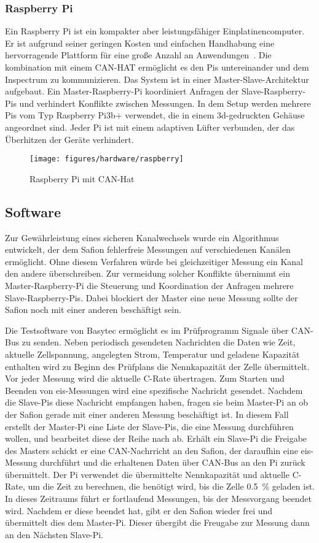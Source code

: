 \subsubsection{Raspberry Pi}
Ein Raspberry Pi ist ein kompakter aber leistungsfähiger Einplatinencomputer.
Er ist aufgrund seiner geringen Kosten und einfachen Handhabung eine hervorragende Plattform für eine
große Anzahl an Anwendungen~\cite{raspberry_rs485}.
Die kombination mit einem CAN-HAT ermöglicht es den Pis untereinander und dem Inspectrum zu kommunizieren.
Das System ist in einer Master-Slave-Architektur aufgebaut.
Ein Master-Raspberry-Pi koordiniert Anfragen der Slave-Raspberry-Pis und verhindert Konflikte zwischen Messungen.
In dem Setup werden mehrere Pis vom Typ Raspberry Pi3b+ verwendet, die in einem 3d-gedruckten Gehäuse angeordnet sind.
Jeder Pi ist mit einem adaptiven Lüfter verbunden, der das Überhitzen der Geräte verhindert.
\begin{figure} [H]
    \centering
    \texttt{[image: figures/hardware/raspberry]}
    \caption{Raspberry Pi mit CAN-Hat~\cite{raspberry_rs485}}
    \label{fig:raspberry}
\end{figure}

\subsection{Software}
\label{subsec:software-basy}
Zur Gewährleistung eines sicheren Kanalwechsels wurde ein Algorithmus entwickelt, der dem Safion fehlerfreie Messungen
auf verschiedenen Kanälen ermöglicht.
Ohne diesem Verfahren würde bei gleichzeitiger Messung ein Kanal den andere überschreiben.
Zur vermeidung solcher Konflikte übernimmt ein Master-Raspberry-Pi die Steuerung und Koordination der Anfragen mehrere
Slave-Raspberry-Pis.
Dabei blockiert der Master eine neue Messung sollte der Safion noch mit einer anderen beschäftigt sein.

Die Testsoftware von Basytec ermöglicht es im Prüfprogramm Signale über CAN-Bus zu senden.
Neben periodisch gesendeten Nachrichten die Daten wie Zeit, aktuelle Zellspannung, angelegten Strom, Temperatur
und geladene Kapazität enthalten wird zu Beginn des Prüfplans die Nennkapazität der Zelle übermittelt.
Vor jeder Messung wird die aktuelle C-Rate übertragen.
Zum Starten und Beenden von \gls{eis}-Messungen wird eine spezifische Nachricht gesendet.
Nachdem die Slave-Pis diese Nachricht empfangen haben, fragen sie beim Master-Pi an ob der Safion gerade mit einer
anderen Messung beschäftigt ist.
In diesem Fall erstellt der Master-Pi eine Liste der Slave-Pis, die eine Messung durchführen wollen, und
bearbeitet diese der Reihe nach ab.
Erhält ein Slave-Pi die Freigabe des Masters schickt er eine CAN-Nachrricht an den Safion, der daraufhin eine
\gls{eis}-Messung durchführt und die erhaltenen Daten über CAN-Bus an den Pi zurück übermittelt.
Der Pi verwendet die übermittelte Nennkapazität und aktuelle C-Rate, um die Zeit zu berechnen, die benötigt wird,
bis die Zelle \SI{0,5}{\%} geladen ist.
In dieses Zeitraums führt er fortlaufend Messungen, bis der Messvorgang beendet wird.
Nachdem er diese beendet hat, gibt er den Safion wieder frei und übermittelt dies dem Master-Pi.
Dieser übergibt die Freugabe zur Messung dann an den Nächsten Slave-Pi.


